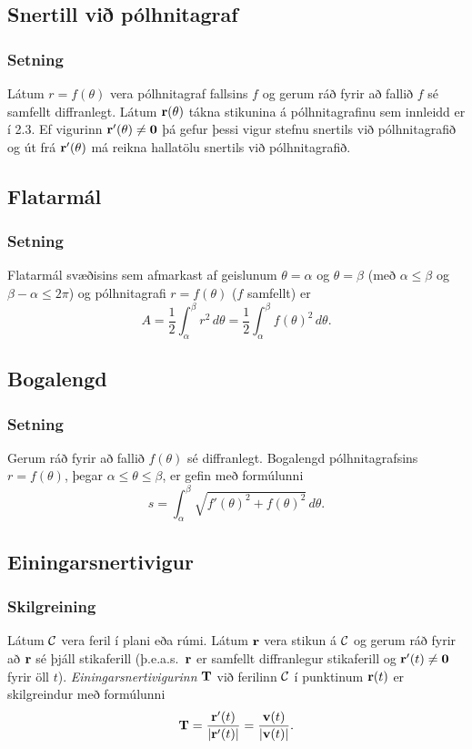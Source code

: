 \subsection{Snertill við pólhnitagraf}
 \subsubsection{Setning }
  Látum $r=f(\theta)$ vera pólhnitagraf fallsins $f$ og gerum ráð fyrir að fallið $f$ sé samfellt diffranlegt.  Látum $\mbox{${\bf r}$}(\theta)$ tákna stikunina á pólhnitagrafinu sem innleidd er í 2.3.  Ef vigurinn 
$\mbox{${\bf r}$}'(\theta)\neq \mbox{${\bf 0}$}$ þá gefur þessi vigur stefnu snertils við pólhnitagrafið og út frá $\mbox{${\bf r}$}'(\theta)$ má reikna hallatölu snertils við pólhnitagrafið.
 



\subsection{Flatarmál}
 \subsubsection{Setning }
  Flatarmál svæðisins sem afmarkast af geislunum 
$\theta=\alpha$ og $\theta=\beta$ (með $\alpha\leq \beta$ og $\beta-\alpha\leq 2\pi$) og pólhnitagrafi $r=f(\theta)$ ($f$ samfellt) er
$$A=\frac{1}{2}\int_\alpha^\beta r^2\,d\theta
=\frac{1}{2}\int_\alpha^\beta f(\theta)^2\,d\theta.$$
 



\subsection{Bogalengd}
 \subsubsection{Setning }
   Gerum ráð fyrir að fallið $f(\theta)$ sé diffranlegt. Bogalengd pólhnitagrafsins $r=f(\theta)$, þegar $\alpha\leq\theta\leq\beta$, er gefin með formúlunni 
$$s=\int_\alpha^\beta \sqrt{f'(\theta)^2+f(\theta)^2}\,d\theta.$$
 



\subsection{Einingarsnertivigur} 

\subsubsection{Skilgreining }
Látum $\cal C$ vera feril í plani eða rúmi.
Látum $\mbox{${\bf r}$}$ vera stikun á $\cal C$ og gerum ráð fyrir að $\mbox{${\bf r}$}$ sé
þjáll stikaferill (þ.e.a.s.~$\mbox{${\bf r}$}$ er samfellt diffranlegur stikaferill og
$\mbox{${\bf r}$}'(t)\neq \mbox{${\bf 0}$}$ fyrir öll $t$).  {\em Einingarsnertivigurinn} $\mbox{${\bf T}$}$ við
ferilinn $\cal C$ í punktinum $\mbox{${\bf r}$}(t)$ er skilgreindur  með formúlunni  
$$\mbox{${\bf T}$}=\frac{\mbox{${\bf r}$}'(t)}{|\mbox{${\bf r}$}'(t)|}=\frac{\mbox{${\bf v}$}(t)}{|\mbox{${\bf v}$}(t)|}.$$




